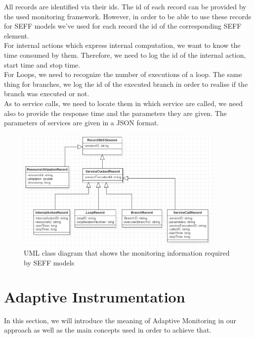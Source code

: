 All records are identified via their ids. The id of each record can be provided by the used monitoring framework. However, in order to be able to use these records for SEFF models we've used for each record the id of the corresponding SEFF element. \\

For internal actions which express internal computation, we want to know the time consumed by them. Therefore, we need to log the id of the internal action, start time and stop time. \\

For Loops, we need to recognize the number of executions of a loop. The same thing for branches, we log the id of the executed branch in order to realise if the branch was executed or not. \\

As to service calls, we need to locate them in which service are called, we need also to provide the response time and the parameters they are given. The parameters of services are given in a JSON format.\\

\begin{figure}[h]
\centering
\includegraphics[width=0.9\textwidth]{figures/records}
\caption{UML class diagram that shows the monitoring information required by SEFF models}
\label{fig:records}
\end{figure}

\section{Adaptive Instrumentation}
\label{sec:Adaptive Instrumentation}
In this section, we will introduce the meaning of Adaptive Monitoring in our approach as well as the main concepts used in order to achieve that.\\

